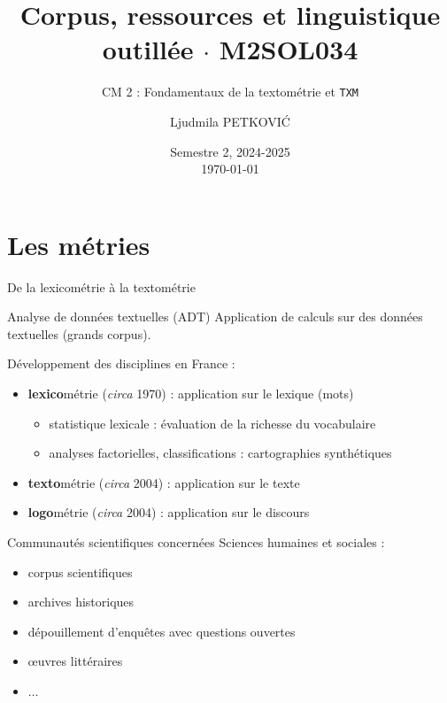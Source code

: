 \documentclass[xetex,xcolor={table,usenames,dvipsnames}]{beamer}
\newcommand{\bolder}[1]{{\color{purple}\bfseries#1}}
\begin{document}
\title{{\large Corpus, ressources et linguistique outillée $\cdot$ \textsc{M2SOL034}}}
\subtitle{CM 2 : Fondamentaux de la textométrie et \texttt{TXM}}
\author{\footnotesize{Ljudmila PETKOVI\'C}}
\date{\scriptsize{Semestre 2, 2024-2025\\\today}}




	\frame{\titlepage}

\section{Les \og{}métries\fg{}}


\begin{frame}{De la lexicométrie à la textométrie}
	\begin{block}{Analyse de données textuelles (\textsc{ADT})}
		\justifying Application de calculs sur des données textuelles (grands corpus).
	\end{block}
	Développement des disciplines en France :
	\begin{itemize}
		\item \bolder{lexico}métrie (\textit{circa} 1970) : application sur le lexique (mots)
		\begin{itemize}
			\item statistique lexicale : évaluation de la richesse du vocabulaire
			\item analyses factorielles, classifications : cartographies synthétiques
		\end{itemize}
		\item \bolder{texto}métrie (\textit{circa} 2004) : application sur le texte
		\item \bolder{logo}métrie (\textit{circa} 2004) : application sur le discours
	\end{itemize}
\end{frame}

\begin{frame}{Communautés scientifiques concernées}
	Sciences humaines et sociales :
	\begin{itemize}
		\item corpus scientifiques
		\item archives historiques
		\item dépouillement d'enquêtes avec questions ouvertes
		\item \oe{}uvres littéraires
		\item $\dots$
	\end{itemize}
\end{frame}
\end{document}
